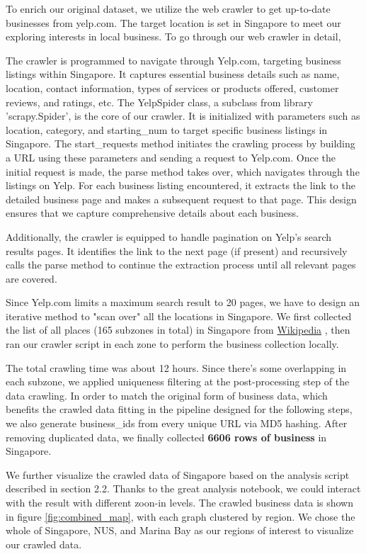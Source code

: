 \documentclass[runningheads]{llncs}
\begin{document}
To enrich our original dataset, we utilize the web crawler to get up-to-date businesses from yelp.com. The target location is set in Singapore to meet our exploring interests in local business. To go through our web crawler in detail, 


The crawler is programmed to navigate through Yelp.com, targeting business listings within Singapore. It captures essential business details such as name, location, contact information, types of services or products offered, customer reviews, and ratings, etc. The YelpSpider class, a subclass from library 'scrapy.Spider', is the core of our crawler. It is initialized with parameters such as location, category, and starting\_num to target specific business listings in Singapore. The start\_requests method initiates the crawling process by building a URL using these parameters and sending a request to Yelp.com. Once the initial request is made, the parse method takes over, which navigates through the listings on Yelp. For each business listing encountered, it extracts the link to the detailed business page and makes a subsequent request to that page. This design ensures that we capture comprehensive details about each business.

Additionally, the crawler is equipped to handle pagination on Yelp's search results pages. It identifies the link to the next page (if present) and recursively calls the parse method to continue the extraction process until all relevant pages are covered. 

Since Yelp.com limits a maximum search result to 20 pages, we have to design an iterative method to "scan over" all the locations in Singapore. We first collected the list of all places (165 subzones in total) in Singapore from \href{https://en.wikipedia.org/wiki/List_of_places_in_Singapore}{Wikipedia} \cite{WikiListOfPlacesSG}, then ran our crawler script in each zone to perform the business collection locally.

The total crawling time was about 12 hours. Since there's some overlapping in each subzone, we applied uniqueness filtering at the post-processing step of the data crawling. In order to match the original form of business data, which benefits the crawled data fitting in the pipeline designed for the following steps, we also generate business\_ids from every unique URL via MD5 hashing. After removing duplicated data, we finally collected \textbf{6606 rows of business} in Singapore. 

We further visualize the crawled data of Singapore based on the analysis script described in section 2.2. Thanks to the great analysis notebook, we could interact with the result with different zoon-in levels\cite{OpenStreetMap}. The crawled business data is shown in figure \ref{fig:combined_map}, with each graph clustered by region. We chose the whole of Singapore, NUS, and Marina Bay as our regions of interest to visualize our crawled data.
\end{document}
